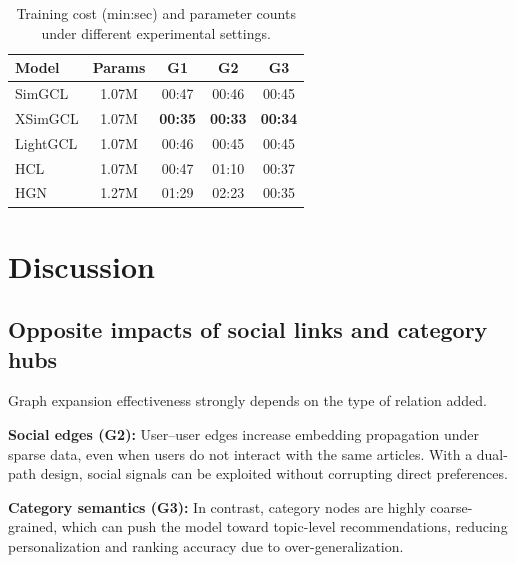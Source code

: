 \documentclass[11pt]{article}
\begin{document}
\begin{table}[!htbp]
    \centering
    \footnotesize
    \setlength{\tabcolsep}{3pt}
    \renewcommand{\arraystretch}{1.1}
    \begin{tabular}{l|c|ccc}
        \toprule
        \textbf{Model} & \textbf{Params} & \textbf{G1}    & \textbf{G2}    & \textbf{G3}    \\
        \midrule
        SimGCL         & 1.07M           & 00:47          & 00:46          & 00:45          \\
        XSimGCL        & 1.07M           & \textbf{00:35} & \textbf{00:33} & \textbf{00:34} \\
        LightGCL       & 1.07M           & 00:46          & 00:45          & 00:45          \\
        \midrule
        HCL            & 1.07M           & 00:47          & 01:10          & 00:37          \\
        HGN            & 1.27M           & 01:29          & 02:23          & 00:35          \\
        \bottomrule
    \end{tabular}
    \caption{Training cost (min:sec) and parameter counts under different experimental settings.}
    \label{tab:efficiency}
\end{table}

\FloatBarrier
\section{Discussion}
\label{sec:discussion}

\subsection{Opposite impacts of social links and category hubs}
Graph expansion effectiveness strongly depends on the type of relation added.

\textbf{Social edges (G2):}
User--user edges increase embedding propagation under sparse data,
even when users do not interact with the same articles.
With a dual-path design, social signals can be exploited without corrupting direct preferences.

\textbf{Category semantics (G3):}
In contrast, category nodes are highly coarse-grained,
which can push the model toward topic-level recommendations,
reducing personalization and ranking accuracy due to over-generalization.
\end{document}
